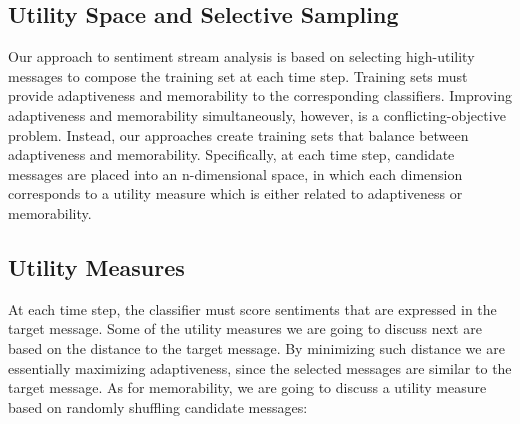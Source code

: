 \documentclass{sig-alternate}
\begin{document}
%
%
%

\subsection{Utility Space and Selective Sampling}

Our approach to sentiment stream analysis is based on selecting high-utility messages to compose the training set at each time step. Training sets must provide adaptiveness and memorability to the corresponding classifiers. Improving adaptiveness and memorability simultaneously, however, is a conflicting-objective problem. Instead, our approaches create training sets that balance between adaptiveness and memorability. Specifically, at each time step, candidate messages are placed into an n-dimensional space, in which each dimension corresponds to a utility measure which is either related to adaptiveness or memorability.

\subsection*{Utility Measures}
At each time step, the classifier must score sentiments that are expressed in the target message. Some of the utility measures we are going to discuss next are based on the distance to the target message. By minimizing such distance we are essentially maximizing adaptiveness, since the selected messages are similar to the target message. As for memorability, we are going to discuss a utility measure based on randomly shuffling candidate messages:
\end{document}

